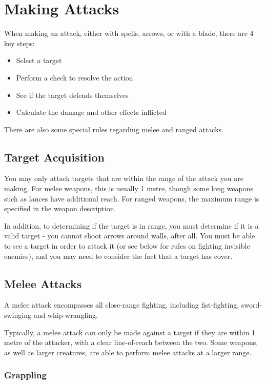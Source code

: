 
\section{Making Attacks}\label{S:Attacks} 

When making an attack, either with spells, arrows, or with a blade, there are 4 key steps:
\begin{itemize}
	\item Select a target 
	\item Perform a check to resolve the action 
	\item See if the target defends themselves
	\item Calculate the damage and other effects inflicted
\end{itemize}

There are also some special rules regarding melee and ranged attacks.
\subsection{Target Acquisition}

You may only attack targets that are within the range of the attack you are making. For melee weapons, this is usually 1 metre, though some long weapons such as lances have additional reach. For ranged weapons, the maximum range is specified in the weapon description. 

In addition, to determining if the target is in range, you must determine if it is a valid target - you cannot shoot arrows around walls, after all. You must be able to see a target in order to attack it (or see below for rules on fighting invisible enemies), and you may need to consider the fact that a target has cover. 


\subsection{Melee Attacks}

A melee attack encompasses all close-range fighting, including fist-fighting, sword-swinging and whip-wrangling. 

Typically, a melee attack can only be made against a target if they are within 1 metre of the attacker, with a clear line-of-reach between the two. Some weapons, as well as larger creatures, are able to perform melee attacks at a larger range.  

\subsubsection{Grappling}

